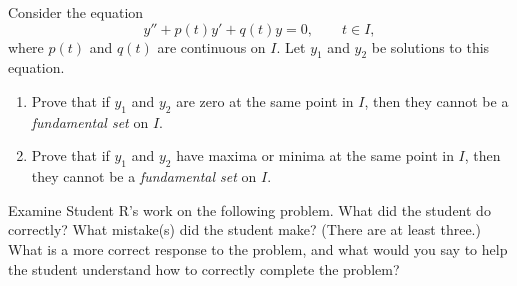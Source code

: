 \documentclass[12pt,letterpaper]{hmcpset}
\begin{document}
\begin{solution}
    \vfill
\end{solution}
\newpage

\begin{problem}[4]
    Consider the equation 
    \begin{equation*}
        y'' + p(t) y' + q(t) y = 0, \qquad t \in I,
    \end{equation*}
    where $p(t)$ and $q(t)$ are continuous on $I$. Let $y_1$ and $y_2$ be
    solutions to this equation.  
    \begin{enumerate}
        \item Prove that if $y_1$ and $y_2$ are zero at the same point in $I$,
            then they cannot be a  \textit{fundamental set} on $I$.
        \item Prove that if $y_1$ and $y_2$ have maxima or minima at the same
            point in $I$, then they cannot be a \textit{fundamental set} on $I$.
    \end{enumerate}
\end{problem}

\begin{solution}
    \vfill
\end{solution}
\newpage

\begin{problem}[5]
    Examine Student R's work on the following problem.  What did the student do correctly?  What mistake(s) did the student make?  (There are at least three.) What is a more correct response to the problem, and what would you say to help the student understand how to correctly complete the problem?

    \begin{center}
    \end{center}
\end{problem}

\begin{solution}
    \vfill
\end{solution}
\end{document}
